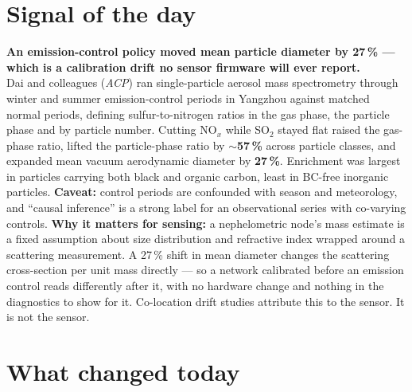 \documentclass[10pt]{article}
\begin{document}
\vspace{6mm}

\section*{\sffamily\bfseries\color{Deep}Signal of the day}
\vspace{-1.5mm}{\color{Amber}\rule{\linewidth}{1.1pt}}\vspace{2.5mm}

\begin{keybox}
{\sffamily\bfseries\small\color{Deep}An emission-control policy moved mean particle diameter by
27\,\% --- which is a calibration drift no sensor firmware will ever report.}\\[1.4mm]
\footnotesize
Dai and colleagues (\textit{ACP}) ran single-particle aerosol mass spectrometry through winter and summer
emission-control periods in Yangzhou against matched normal periods, defining sulfur-to-nitrogen ratios in
the gas phase, the particle phase and by particle number. Cutting NO$_x$ while SO$_2$ stayed flat raised
the gas-phase ratio, lifted the particle-phase ratio by \textbf{$\sim$57\,\%} across particle classes, and
expanded mean vacuum aerodynamic diameter by \textbf{27\,\%}. Enrichment was largest in particles carrying
both black and organic carbon, least in BC-free inorganic particles.
\textbf{Caveat:} control periods are confounded with season and meteorology, and ``causal inference'' is a
strong label for an observational series with co-varying controls.
\textbf{Why it matters for sensing:} a nephelometric node's mass estimate is a fixed assumption about size
distribution and refractive index wrapped around a scattering measurement. A 27\,\% shift in mean diameter
changes the scattering cross-section per unit mass directly --- so a network calibrated before an emission
control reads differently after it, with no hardware change and nothing in the diagnostics to show for it.
Co-location drift studies attribute this to the sensor. It is not the sensor.\par
\end{keybox}

\vspace{3mm}

\section*{\sffamily\bfseries\color{Deep}What changed today}
\vspace{-1.5mm}{\color{Amber}\rule{\linewidth}{1.1pt}}\vspace{2.5mm}
\end{document}
